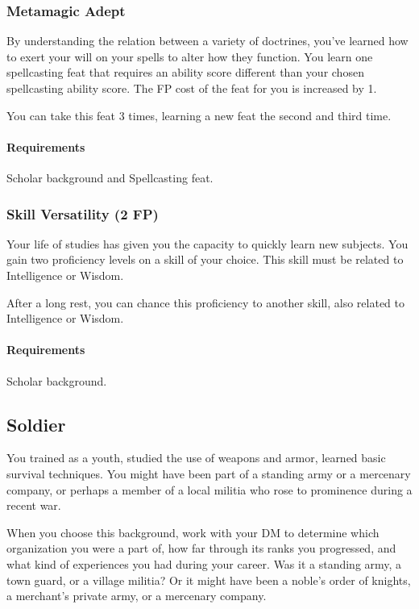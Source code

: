         \subsubsection{Metamagic Adept} \label{feat::metamagicadept}
            By understanding the relation between a variety of doctrines, you've learned how to exert your will on your spells to alter how they function.
            You learn one spellcasting feat that requires an ability score different than your chosen spellcasting ability score.
            The FP cost of the feat for you is increased by 1.

            You can take this feat 3 times, learning a new feat the second and third time.
            \paragraph{Requirements} Scholar background and Spellcasting feat.
        \subsubsection{Skill Versatility (2 FP)} \label{feat::skillversatility}
            Your life of studies has given you the capacity to quickly learn new subjects.
            You gain two proficiency levels on a skill of your choice.
            This skill must be related to Intelligence or Wisdom.

            After a long rest, you can chance this proficiency to another skill, also related to Intelligence or Wisdom.
            \paragraph{Requirements} Scholar background.
\subsection*{Soldier} \label{ssec::soldier}
    You trained as a youth, studied the use of weapons and armor, learned basic survival techniques. %
    You might have been part of a standing army or a mercenary company, or perhaps a member of a local militia who rose to prominence during a recent war.


    When you choose this background, work with your DM to determine which organization you were a part of, how far through its ranks you progressed, and what kind of experiences you had during your career.
    Was it a standing army, a town guard, or a village militia?
    Or it might have been a noble's order of knights, a merchant's private army, or a mercenary company.

